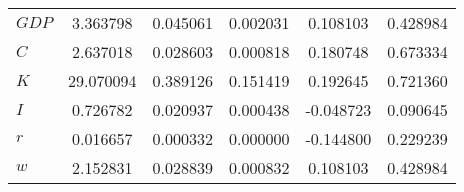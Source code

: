 \begin{center}
\begin{longtable}{lccccc}
$GDP       $	 & 	        3.363798	 & 	        0.045061	 & 	        0.002031	 & 	        0.108103	 & 	        0.428984 \\ 
$C         $	 & 	        2.637018	 & 	        0.028603	 & 	        0.000818	 & 	        0.180748	 & 	        0.673334 \\ 
$K         $	 & 	       29.070094	 & 	        0.389126	 & 	        0.151419	 & 	        0.192645	 & 	        0.721360 \\ 
$I         $	 & 	        0.726782	 & 	        0.020937	 & 	        0.000438	 & 	       -0.048723	 & 	        0.090645 \\ 
$r         $	 & 	        0.016657	 & 	        0.000332	 & 	        0.000000	 & 	       -0.144800	 & 	        0.229239 \\ 
$w         $	 & 	        2.152831	 & 	        0.028839	 & 	        0.000832	 & 	        0.108103	 & 	        0.428984 \\ 
\end{longtable}
 \end{center}
